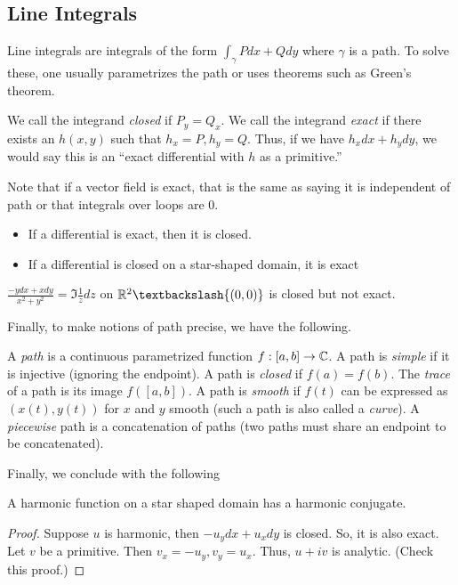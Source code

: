 \documentclass[11pt,leqno,oneside]{amsart}
\begin{document}
  \subsection{Line Integrals}
  Line integrals are integrals of the form $\int_\gamma Pdx + Qdy$ where
  $\gamma$ is a path. To solve these, one usually parametrizes the path or uses
  theorems such as Green's theorem.
  \begin{defn}
    We call the integrand \emph{closed} if $P_y = Q_x$. We call the integrand
    \emph{exact} if there exists an $h(x,y)$ such that $h_x = P, h_y = Q$. Thus,
    if we have $h_xdx+h_ydy$, we would say this is an ``exact differential with
    $h$ as a primitive.''
  \end{defn}
  Note that if a vector field is exact, that is the same as saying it is
  independent of path or that integrals over loops are 0.
  \begin{rmk}
    \begin{itemize}
    \item If a differential is exact, then it is closed.
    \item If a differential is closed on a star-shaped domain, it is exact
    \end{itemize}
  \end{rmk}
  \begin{example}
    $\frac{-ydx+xdy}{x^2+y^2} = \Im \frac{1}{z}dz$ on $\R^2 \textbackslash
    \{(0,0)\}$ is closed but not exact.
  \end{example}
  Finally, to make notions of path precise, we have the following.
\begin{defn}
    A \emph{path} is a continuous parametrized function $f:[a,b] \to {\mathbb C}$.  A
    path is \emph{simple} if it is injective (ignoring the endpoint).  A path is
    \emph{closed} if $f(a) = f(b)$.  The \emph{trace} of a path is its image
    $f([a,b])$.  A path is \emph{smooth} if $f(t)$ can be expressed as $(x(t),
    y(t))$ for $x$ and $y$ smooth (such a path is also called a \emph{curve}).
    A \emph{piecewise} path is a concatenation of paths (two paths must share an
    endpoint to be concatenated).
  \end{defn}

  Finally, we conclude with the following
  \begin{thm}
    A harmonic function on a star shaped domain has a harmonic conjugate.
  \end{thm}
  \begin{proof}
    Suppose $u$ is harmonic, then $-u_ydx+u_xdy$ is closed. So, it is also
    exact. Let $v$ be a primitive. Then $v_x = -u_y, v_y=u_x$. Thus, $u+iv$ is
    analytic. (Check this proof.)
  \end{proof}
\end{document}
